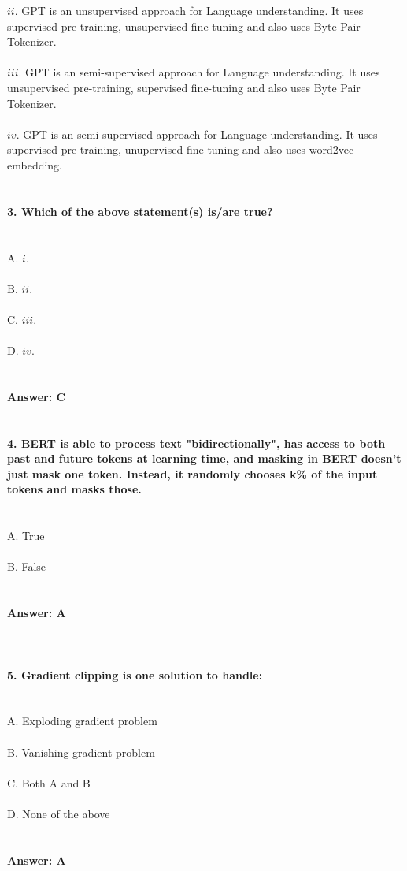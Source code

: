 \documentclass[prl,twocolumn,showpacs,preprintnumbers,superscriptaddress]{revtex4}
\theoremstyle{plain}
\theoremstyle{definition}
\begin{document}
\begin{widetext}
$ii.$ GPT is an unsupervised approach for Language understanding. It uses supervised pre-training, unsupervised fine-tuning and also uses Byte Pair Tokenizer.
\\
\\
$iii.$ GPT is an semi-supervised approach for Language understanding. It uses unsupervised pre-training, supervised fine-tuning and also uses Byte Pair Tokenizer.
\\
\\
$iv.$ GPT is an semi-supervised approach for Language understanding. It uses supervised pre-training, unupervised fine-tuning and also uses word2vec embedding.
\\
\\
\\
\textbf{3. Which of the above statement(s) is/are true?}
\\
\\
\\
\noindent A. $i.$
\\
\\
B. $ii.$
\\
\\
C. $iii.$
\\
\\
D. $iv.$
\\
\\
\\
\textbf{Answer: C}
\\
\\
\\
\textbf{4. BERT is able to process text "bidirectionally", has access to both past and future tokens at learning time, and masking in BERT doesn't just mask one token. Instead, it randomly chooses k\% of the input tokens and masks those.}
\\
\\
\\
A. True
\\
\\
B. False
\\
\\
\\
\textbf{Answer: A}
\\
\\
\\
\\
\textbf{5. Gradient clipping is one solution to handle:}
\\
\\
\\
A. Exploding gradient problem
\\
\\
B. Vanishing gradient problem
\\
\\
C. Both A and B
\\
\\
D. None of the above
\\
\\
\\
\textbf{Answer: A}
\\
\\
\\
\\
\\
\\
\end{widetext}
\end{document}
